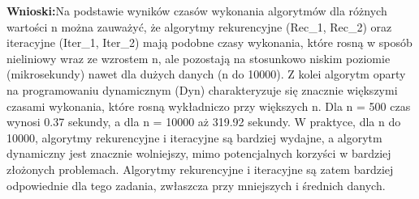 \documentclass{article}
\theoremstyle{definition}
\begin{document}
	\textbf{Wnioski:}Na podstawie wyników czasów wykonania algorytmów dla różnych wartości n można zauważyć, że algorytmy rekurencyjne (Rec\_1, Rec\_2) oraz iteracyjne (Iter\_1, Iter\_2) mają podobne czasy wykonania, które rosną w sposób nieliniowy wraz ze wzrostem n, ale pozostają na stosunkowo niskim poziomie (mikrosekundy) nawet dla dużych danych (n do 10000). Z kolei algorytm oparty na programowaniu dynamicznym (Dyn) charakteryzuje się znacznie większymi czasami wykonania, które rosną wykładniczo przy większych n. Dla n = 500 czas wynosi 0.37 sekundy, a dla n = 10000 aż 319.92 sekundy. W praktyce, dla n do 10000, algorytmy rekurencyjne i iteracyjne są bardziej wydajne, a algorytm dynamiczny jest znacznie wolniejszy, mimo potencjalnych korzyści w bardziej złożonych problemach. Algorytmy rekurencyjne i iteracyjne są zatem bardziej odpowiednie dla tego zadania, zwłaszcza przy mniejszych i średnich danych.
\end{document}
